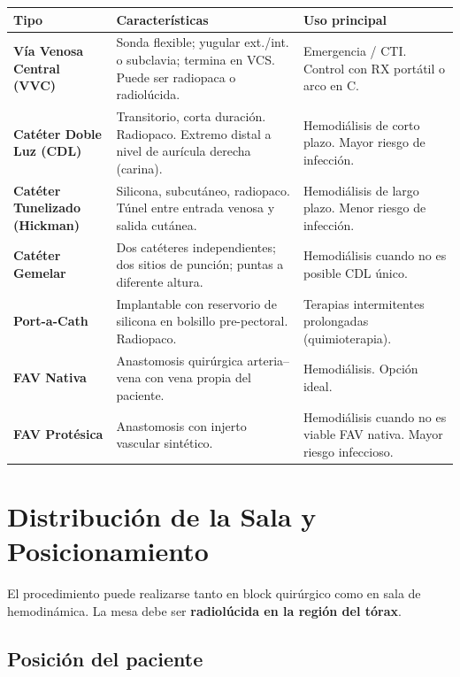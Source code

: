 {\renewcommand{\arraystretch}{1.3}
	\begin{center}
		\begin{tabular}{|>{\bfseries}p{3.2cm}|p{5cm}|p{5.5cm}|}
			\hline
			\textbf{Tipo} & \textbf{Características} & \textbf{Uso principal} \\
			\hline
			Vía Venosa Central (VVC) & Sonda flexible; yugular ext./int. o subclavia; termina en VCS. Puede ser radiopaca o radiolúcida. & Emergencia / CTI. Control con RX portátil o arco en C. \\
			\hline
			Catéter Doble Luz (CDL) & Transitorio, corta duración. Radiopaco. Extremo distal a nivel de aurícula derecha (carina). & Hemodiálisis de corto plazo. Mayor riesgo de infección. \\
			\hline
			Catéter Tunelizado (Hickman) & Silicona, subcutáneo, radiopaco. Túnel entre entrada venosa y salida cutánea. & Hemodiálisis de largo plazo. Menor riesgo de infección. \\
			\hline
			Catéter Gemelar & Dos catéteres independientes; dos sitios de punción; puntas a diferente altura. & Hemodiálisis cuando no es posible CDL único. \\
			\hline
			Port-a-Cath & Implantable con reservorio de silicona en bolsillo pre-pectoral. Radiopaco. & Terapias intermitentes prolongadas (quimioterapia). \\
			\hline
			FAV Nativa & Anastomosis quirúrgica arteria--vena con vena propia del paciente. & Hemodiálisis. Opción ideal. \\
			\hline
			FAV Protésica & Anastomosis con injerto vascular sintético. & Hemodiálisis cuando no es viable FAV nativa. Mayor riesgo infeccioso. \\
			\hline
		\end{tabular}
	\end{center}
}

\section*{Distribución de la Sala y Posicionamiento}

El procedimiento puede realizarse tanto en block quirúrgico como en sala de hemodinámica. La mesa debe ser \textbf{radiolúcida en la región del tórax}.

\subsection*{Posición del paciente}

